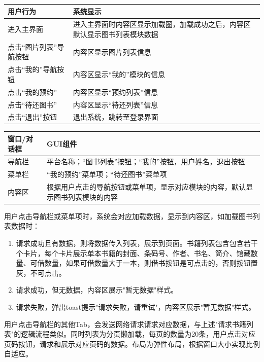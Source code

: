 \begin{table}[ht]
    \centering
    \begin{tabular*}{\textwidth}{p{}p{}}
        \hline
        用户行为 & 系统显示\\
        \hline
        进入主界面 & 进入主界面时内容区显示加载圈，加载成功之后，内容区默认显示图书列表模块数据\\
        点击“图片列表”导航按钮 & 内容区显示图片列表信息 \\
        点击“我的”导航按钮 & 内容区显示“我的”模块的信息 \\
        点击“我的预约” & 内容区显示“预约列表”信息 \\
        点击“待还图书” & 内容区显示“待还列表”信息 \\
        点击“退出”按钮 & 退出系统，跳转至登录界面 \\
        \hline
    \end{tabular*}
    \begin{tabular*}{\textwidth}{p{}p{}}
        \hline
        窗口/对话框  & GUI组件 \\
        \hline
        导航栏 & 平台名称；“图书列表”按钮；“我的”按钮，用户姓名，退出按钮\\
        菜单栏 & “我的预约”菜单项；“待还图书”菜单项 \\
        内容区 & 根据用户点击的导航按钮或菜单项，显示对应模块的内容，默认显示图书列表模块的内容 \\
        \hline
    \end{tabular*}
\end{table}

用户点击导航栏或菜单项时，系统会对应加载数据，显示到内容区，如加载图书列表数据时：
\begin{enumerate}
    \item 请求成功且有数据，则将数据传入列表，展示到页面。书籍列表包含包含若干个卡片，每个卡片展示单本书籍的封面、条码号、作者、书名、简介、馆藏数量、可借数量，如果可借数量大于一本，则借书按钮是可点击的，否则按钮置灰，不可点击。
    \item 请求成功，但无数据，内容区展示"暂无数据"样式。
    \item 请求失败，弹出toast提示"请求失败，请重试"，内容区展示"暂无数据"样式。
\end{enumerate}
用户点击导航栏的其他Tab，会发送网络请求请求对应数据，与上述"请求书籍列表"的逻辑流程类似。同时列表为分页懒加载，每页的数量为20条，用户点击对应页码按钮，请求和展示对应页码的数据。布局为弹性布局，根据窗口大小实现比例自适应。
